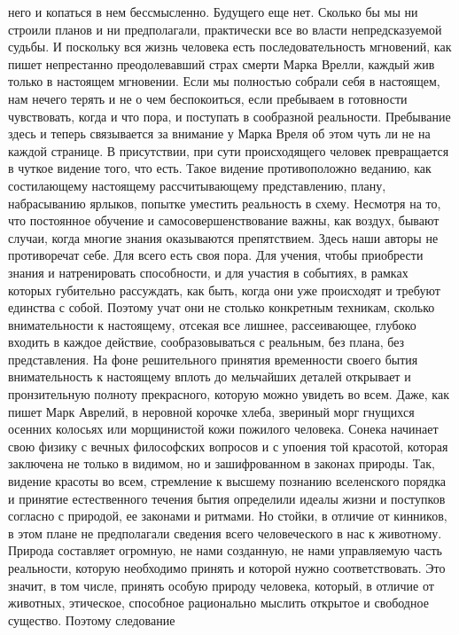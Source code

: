 него и копаться в нем бессмысленно. Будущего еще нет. Сколько бы мы ни строили
планов и ни предполагали, практически все во власти непредсказуемой судьбы. И
поскольку вся жизнь человека есть последовательность мгновений, как пишет
непрестанно преодолевавший страх смерти Марка Врелли, каждый жив только в
настоящем мгновении. Если мы полностью собрали себя в настоящем, нам нечего
терять и не о чем беспокоиться, если пребываем в готовности чувствовать, когда и
что пора, и поступать в сообразной реальности. Пребывание здесь и теперь
связывается за внимание у Марка Вреля об этом чуть ли не на каждой странице. В
присутствии, при сути происходящего человек превращается в чуткое видение того,
что есть. Такое видение противоположно веданию, как состилающему настоящему
рассчитывающему представлению, плану, набрасыванию ярлыков, попытке уместить
реальность в схему. Несмотря на то, что постоянное обучение и
самосовершенствование важны, как воздух, бывают случаи, когда многие знания
оказываются препятствием. Здесь наши авторы не противоречат себе. Для всего есть
своя пора. Для учения, чтобы приобрести знания и натренировать способности, и
для участия в событиях, в рамках которых губительно рассуждать, как быть, когда
они уже происходят и требуют единства с собой. Поэтому учат они не столько
конкретным техникам, сколько внимательности к настоящему, отсекая все лишнее,
рассеивающее, глубоко входить в каждое действие, сообразовываться с реальным,
без плана, без представления. На фоне решительного принятия временности своего
бытия внимательность к настоящему вплоть до мельчайших деталей открывает и
пронзительную полноту прекрасного, которую можно увидеть во всем. Даже, как
пишет Марк Аврелий, в неровной корочке хлеба, звериный морг гнущихся осенних
колосьях или морщинистой кожи пожилого человека. Сонека начинает свою физику с
вечных философских вопросов и с упоения той красотой, которая заключена не
только в видимом, но и зашифрованном в законах природы. Так, видение красоты во
всем, стремление к высшему познанию вселенского порядка и принятие естественного
течения бытия определили идеалы жизни и поступков согласно с природой, ее
законами и ритмами. Но стойки, в отличие от кинников, в этом плане не
предполагали сведения всего человеческого в нас к животному. Природа составляет
огромную, не нами созданную, не нами управляемую часть реальности, которую
необходимо принять и которой нужно соответствовать. Это значит, в том числе,
принять особую природу человека, который, в отличие от животных, этическое,
способное рационально мыслить открытое и свободное существо. Поэтому следование
